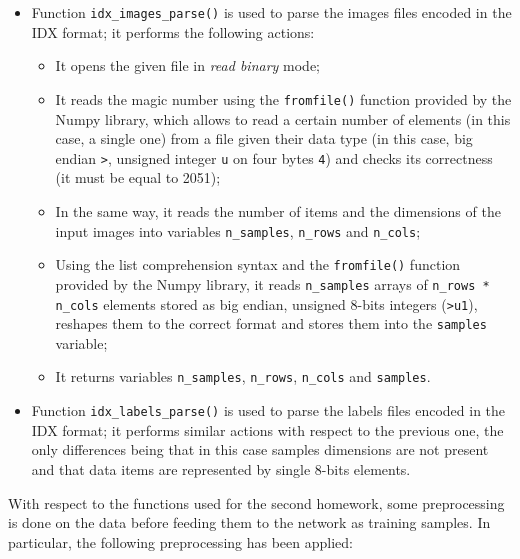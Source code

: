 \documentclass[letterpaper,headings=standardclasses]{scrartcl}
\begin{document}
\begin{itemize}

    \item Function \texttt{idx\_images\_parse()} is used to parse the images files encoded in the IDX format; it performs the following actions:

        \begin{itemize}

        \item It opens the given file in \emph{read binary} mode;

        \item It reads the magic number using the \texttt{fromfile()} function provided by the Numpy library, which allows to read a certain number of elements (in this case, a single one) from a file given their data type (in this case, big endian \texttt{>}, unsigned integer \texttt{u} on four bytes \texttt{4}) and checks its correctness (it must be equal to 2051);

        \item In the same way, it reads the number of items and the dimensions of the input images into variables \texttt{n\_samples}, \texttt{n\_rows} and \texttt{n\_cols};

        \item Using the list comprehension syntax and the \texttt{fromfile()} function provided by the Numpy library, it reads \texttt{n\_samples} arrays of \texttt{n\_rows * n\_cols} elements stored as big endian, unsigned 8-bits integers (\texttt{>u1}), reshapes them to the correct format and stores them into the \texttt{samples} variable;

        \item It returns variables \texttt{n\_samples}, \texttt{n\_rows}, \texttt{n\_cols} and \texttt{samples}.

        \end{itemize}

    \item Function \texttt{idx\_labels\_parse()} is used to parse the labels files encoded in the IDX format; it performs similar actions with respect to the previous one, the only differences being that in this case samples dimensions are not present and that data items are represented by single 8-bits elements.

\end{itemize}

With respect to the functions used for the second homework, some preprocessing is done on the data before feeding them to the network as training samples. In particular, the following preprocessing has been applied:
\end{document}
